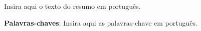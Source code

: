 \label{sec:resumo}

Insira aqui o texto do resumo em português.

\textbf{Palavras-chaves}: Insira aqui as palavras-chave em português.